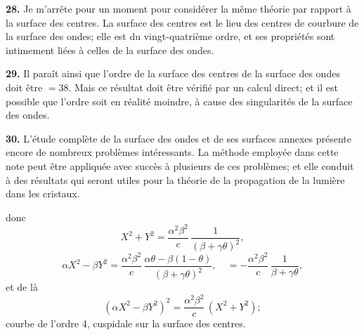\documentclass[11pt,a4paper]{book}
\begin{document}
\textbf{28.} Je m'arr\^ete pour un moment pour consid\'erer la m\^eme th\'eorie par
rapport \`a la surface des centres. La surface des centres est le lieu des centres de
courbure de la surface des ondes; elle est du vingt-quatri\`eme ordre, et ses
propri\'et\'es sont intimement li\'ees \`a celles de la surface des ondes.

\textbf{29.} Il para\^it ainsi que l'ordre de la surface des centres de la surface des
ondes doit \^etre $= 38$. Mais ce r\'esultat doit \^etre v\'erifi\'e par un calcul direct; et il
est possible que l'ordre soit en r\'ealit\'e moindre, \`a cause des singularit\'es de la
surface des ondes.

\textbf{30.} L'\'etude compl\`ete de la surface des ondes et de ses surfaces annexes
pr\'esente encore de nombreux probl\`emes int\'eressants. La m\'ethode employ\'ee dans
cette note peut \^etre appliqu\'ee avec succ\`es \`a plusieurs de ces probl\`emes; et elle
conduit \`a des r\'esultats qui seront utiles pour la th\'eorie de la propagation de la
lumi\`ere dans les cristaux.
\clearpage


\setcounter{page}{251}


\begin{flushright}
\end{flushright}

donc
\[
X^2 + Y^2 = \frac{\alpha^2\beta^2}{c}\,\frac{1}{(\beta+\gamma\theta)^2},
\]
\[
\alpha X^2 - \beta Y^2 = \frac{\alpha^2\beta^2}{c}\,\frac{\alpha\theta - \beta(1-\theta)}{(\beta+\gamma\theta)^2},
\quad = -\frac{\alpha^2\beta^2}{c}\,\frac{1}{\beta+\gamma\theta},
\]
et de l\`a
\[
(\alpha X^2 - \beta Y^2)^2 = \frac{\alpha^2\beta^2}{c}\,(X^2 + Y^2);
\]
courbe de l'ordre 4, cuspidale sur la surface des centres.
\end{document}
